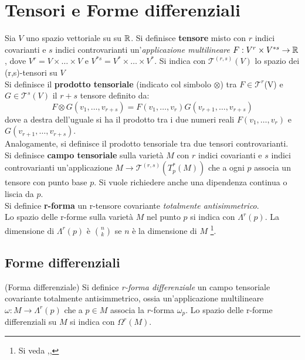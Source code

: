 \section{Tensori e Forme differenziali}
Sia $V$ uno spazio vettoriale su su $\mathbb{R}$.
Si definisce \textbf{tensore} misto con $r$ indici covarianti e $s$ indici
controvarianti un'\emph{applicazione multilineare} $F : V^r \times V^{*s} \to
\mathbb{R}$ , dove $V^r = V \times \dots \times V$ e
$V^{*s} =  V^* \times \dots \times V^*$. 
Si indica con $\mathcal{T}^{(r,s)}(V)$ lo spazio dei (r,s)-tensori su $V$\\

Si definisce il \textbf{prodotto tensoriale} (indicato col simbolo $\otimes$) tra
$F \in \mathcal{T}^r$(V) e $G \in \mathcal{T}^s(V)$ il $r+s$ tensore definito da:
$$ F \otimes G (v_1,\dots,v_{r+s}) = F(v_1,\dots,v_r)G(v_{r+1},\dots,v_{r+s})$$
dove a destra dell'uguale si ha il prodotto tra i due numeri reali
$F(v_1,\dots,v_r)$ e $G(v_{r+1},\dots,v_{r+s})$.\\
Analogamente, si definisce il prodotto tensoriale tra due tensori controvarianti.\\

Si definisce \textbf{campo tensoriale} sulla varietà $M$ con $r$ indici covarianti
e $s$ indici controvarianti un'applicazione $ M \to \mathcal{T}^{(r,s)}(T_p^*(M)) $
che a ogni $p$ associa un tensore con punto base $p$. Si vuole richiedere anche
una dipendenza continua o liscia da $p$.\\

Si definice \textbf{r-forma} un r-tensore covariante \emph{totalmente antisimmetrico}.\\

Lo spazio delle r-forme sulla varietà $M$ nel punto $p$ si indica con $\Lambda^r(p)$.
La dimensione di $\Lambda^r(p)$ è ${n}\choose{k}$ se $n$ è la dimensione di $M$
\footnote{ Si veda \cite{sernesi},\cite{boothby},\cite{nakahara} }.
\subsection{Forme differenziali}
\begin{definition}{(Forma differenziale)}
   Si definice \emph{r-forma differenziale} un campo tensoriale covariante
  totalmente antisimmetrico, ossia un'applicazione multilineare
  $\omega : M \to \Lambda^r(p)$ che a $p \in M$ associa la $r$-forma $\omega_p$.
  Lo spazio delle r-forme differenziali su $M$ si indica con $\Omega^r(M)$.
\end{definition}

